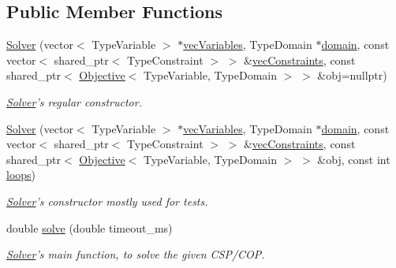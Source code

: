 \subsection*{Public Member Functions}
\begin{DoxyCompactItemize}
\item 
\hyperlink{classghost_1_1Solver_aee74bbdf00494dc209d4909bf9fcb544}{Solver} (vector$<$ Type\-Variable $>$ $\ast$\hyperlink{classghost_1_1Solver_a2d033a454234b2277aabdcc4d89eaba2}{vec\-Variables}, Type\-Domain $\ast$\hyperlink{classghost_1_1Solver_ad9292e9219261ba8058fec05b453c0c9}{domain}, const vector$<$ shared\-\_\-ptr$<$ Type\-Constraint $>$ $>$ \&\hyperlink{classghost_1_1Solver_a170746edcfb777b12978444c2ab3962e}{vec\-Constraints}, const shared\-\_\-ptr$<$ \hyperlink{classghost_1_1Objective}{Objective}$<$ Type\-Variable, Type\-Domain $>$ $>$ \&obj=nullptr)
\begin{DoxyCompactList}\small\item\em \hyperlink{classghost_1_1Solver}{Solver}'s regular constructor. \end{DoxyCompactList}\item 
\hyperlink{classghost_1_1Solver_a512335329b22a91700bdfa7870f053e9}{Solver} (vector$<$ Type\-Variable $>$ $\ast$\hyperlink{classghost_1_1Solver_a2d033a454234b2277aabdcc4d89eaba2}{vec\-Variables}, Type\-Domain $\ast$\hyperlink{classghost_1_1Solver_ad9292e9219261ba8058fec05b453c0c9}{domain}, const vector$<$ shared\-\_\-ptr$<$ Type\-Constraint $>$ $>$ \&\hyperlink{classghost_1_1Solver_a170746edcfb777b12978444c2ab3962e}{vec\-Constraints}, const shared\-\_\-ptr$<$ \hyperlink{classghost_1_1Objective}{Objective}$<$ Type\-Variable, Type\-Domain $>$ $>$ \&obj, const int \hyperlink{classghost_1_1Solver_aa6a77e14862a9be467e6c6c76124b526}{loops})
\begin{DoxyCompactList}\small\item\em \hyperlink{classghost_1_1Solver}{Solver}'s constructor mostly used for tests. \end{DoxyCompactList}\item 
double \hyperlink{classghost_1_1Solver_af025b99595aeff4fd9a174bcbd66a991}{solve} (double timeout\-\_\-ms)
\begin{DoxyCompactList}\small\item\em \hyperlink{classghost_1_1Solver}{Solver}'s main function, to solve the given C\-S\-P/\-C\-O\-P. \end{DoxyCompactList}\end{DoxyCompactItemize}
